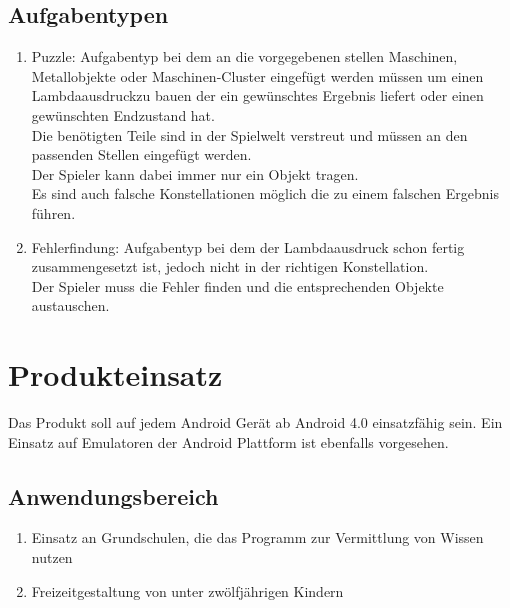 \documentclass{scrartcl}
\begin{document}
\subsection{Aufgabentypen}

\begin{enumerate}
	\item \label{aufgabentyp:puzzle} Puzzle: Aufgabentyp bei dem an die vorgegebenen stellen Maschinen, Metallobjekte oder Maschinen-Cluster eingefügt werden müssen um einen \glqq Lambdaausdruck\grqq zu bauen der ein gewünschtes Ergebnis liefert oder einen gewünschten Endzustand hat.\\
	Die benötigten Teile sind in der Spielwelt verstreut und müssen an den passenden Stellen eingefügt werden.\\
	Der Spieler kann dabei immer nur ein Objekt tragen.\\
	Es sind auch falsche Konstellationen möglich die zu einem falschen Ergebnis führen.\\
	\item \label{aufgabentyp:fehlerfindung} Fehlerfindung: Aufgabentyp bei dem der Lambdaausdruck schon fertig zusammengesetzt ist, jedoch nicht in der richtigen Konstellation.\\
	Der Spieler muss die Fehler finden und die entsprechenden Objekte austauschen.\\
\end{enumerate}

\clearpage









\section{Produkteinsatz}

Das Produkt soll auf jedem Android Gerät ab Android 4.0 einsatzfähig sein. Ein Einsatz auf Emulatoren der Android Plattform ist ebenfalls vorgesehen.

\subsection{Anwendungsbereich}

\begin{enumerate}
	\item Einsatz an Grundschulen, die das Programm zur Vermittlung von Wissen nutzen
	\item Freizeitgestaltung von unter zwölfjährigen Kindern
\end{enumerate}
\end{document}
